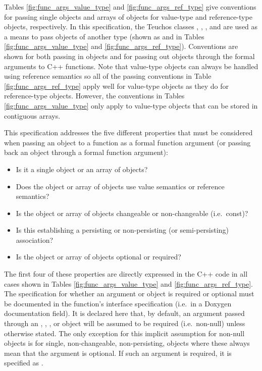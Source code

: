\documentclass[pdf,ps2pdf,11pt]{SANDreport}
\begin{document}
Tables {}\ref{fig:func_args_value_type} and
{}\ref{fig:func_args_ref_type} give conventions for passing single
objects and arrays of objects for value-type {} and reference-type {} objects,
respectively.  In this specification, the Teuchos classes {},
{}, {}, and {} are used as a
means to pass objects of another type (shown as {} and
{} in Tables {}\ref{fig:func_args_value_type} and
{}\ref{fig:func_args_ref_type}).  Conventions are shown for both
passing in objects and for passing out objects through the formal
arguments to C++ functions.  Note that value-type objects can always
be handled using reference semantics so all of the passing conventions
in Table {}\ref{fig:func_args_ref_type} apply well for value-type
objects as they do for reference-type objects.  However, the
conventions in Tables {}\ref{fig:func_args_value_type} only apply to
value-type objects that can be stored in contiguous arrays.

This specification addresses the five different properties that must
be considered when passing an object to a function as a formal
function argument (or passing back an object through a formal function
argument):

\begin{itemize}

{}\item Is it a single object or an array of objects?

{}\item Does the object or array of objects use value semantics or
reference semantics?

{}\item Is the object or array of objects changeable or non-changeable
(i.e.\ const)?

{}\item Is this establishing a persisting or non-persisting (or
semi-persisting) association?

{}\item Is the object or array of objects optional or required?

\end{itemize}

The first four of these properties are directly expressed in the C++
code in all cases shown in Tables {}\ref{fig:func_args_value_type} and
{}\ref{fig:func_args_ref_type}.  The specification for whether an
argument or object is required or optional must be documented in the
function's interface specification (i.e.\ in a Doxygen documentation
{} field).  It is declared here that, by default, an
argument passed through an {}, {},
{}, or {} object will be assumed to be
required (i.e.\ non-null) unless otherwise stated.  The only exception
for this implicit assumption for non-null objects is {} for single, non-changeable, non-persisting, objects
where these always mean that the argument is optional.  If such an
argument is required, it is specified as {}.
\end{document}
